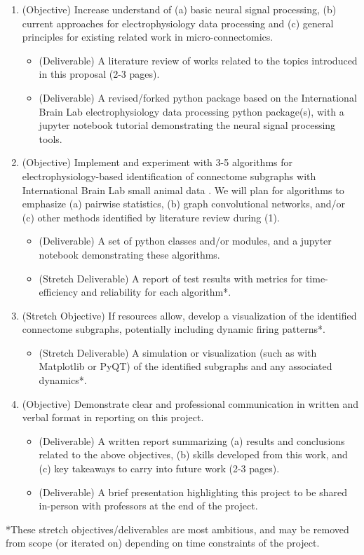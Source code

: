 \documentclass[11pt]{article}
\begin{document}
\begin{enumerate}
    \item (Objective) Increase understand of (a) basic neural signal processing, (b) current approaches for electrophysiology data processing and (c) general principles for existing related work in micro-connectomics.
    \begin{itemize}
        \item (Deliverable) A literature review of works related to the topics introduced in this proposal (2-3 pages).
        \item (Deliverable) A revised/forked python package based on the International Brain Lab electrophysiology data processing python package(s), with a jupyter notebook tutorial demonstrating the neural signal processing tools.
    \end{itemize}
    
    \item (Objective) Implement and experiment with 3-5 algorithms for electrophysiology-based identification of connectome subgraphs with International Brain Lab small animal data \cite{Laboratory2022, zhang2025neuralencodingdecodingscale}. We will plan for algorithms to emphasize (a) pairwise statistics, (b) graph convolutional networks, and/or (c) other methods identified by literature review during (1).
    \begin{itemize}
        \item (Deliverable) A set of python classes and/or modules, and a jupyter notebook demonstrating these algorithms.
        \item (Stretch Deliverable) A report of test results with metrics for time-efficiency and reliability for each algorithm*.
    \end{itemize}
    
    \item (Stretch Objective) If resources allow, develop a visualization of the identified connectome subgraphs, potentially including dynamic firing patterns*.
    \begin{itemize}
        \item (Stretch Deliverable) A simulation or visualization (such as with Matplotlib or PyQT) of the identified subgraphs and any associated dynamics*.
    \end{itemize}

    \item (Objective) Demonstrate clear and professional communication in written and verbal format in reporting on this project.
    \begin{itemize}
        \item (Deliverable) A written report summarizing (a) results and conclusions related to the above objectives, (b) skills developed from this work, and (c) key takeaways to carry into future work (2-3 pages).
        \item (Deliverable) A brief presentation highlighting this project to be shared in-person with professors at the end of the project.
    \end{itemize}
\end{enumerate}
*These stretch objectives/deliverables are most ambitious, and may be removed from scope (or iterated on) depending on time constraints of the project.
\end{document}
